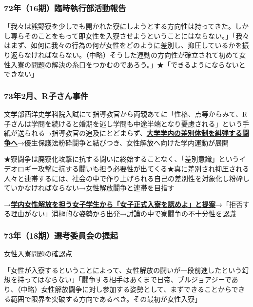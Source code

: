 \subsubsection{\large 72年（16期）臨時執行部活動報告}
「我々は熊野寮を少しでも開かれた寮にしようとする方向性は持ってきた。しかし専らそのことをもって即女性を入寮させようということにはならない。」\newline 「我々はまず、如何に我々の行為の何が女性をどのように差別し、抑圧しているかを振り返らなければならない。（中略）そうした運動の方向性が確立されて初めて女性入寮の問題の解決の糸口をつかむのであろう。」\newline ★「できるようにならないとできない」

\subsubsection{\large 73年2月、R子さん事件}
文学部西洋史学科院入試にて\newline 指導教官から両親あてに「性格、点等からみて、R子さんは学問を続けると婚期を逃し学問も中途半端となり憂慮される」という手紙が送られる\newline →指導教官の追及にとどまらず、\uline{\bf{大学学内の差別体制を糾弾する闘争へ}}\newline →優生保護法粉砕闘争と結びつき、女性解放へ向けた学内運動が展開

\vspace{1mm}
\noindent ★寮闘争は廃寮化攻撃に抗する闘いに終始することなく、「差別意識」というイデオロギー攻撃に抗する闘いも担う必要性が出てくる\newline ★真に差別され抑圧される人々と連帯するには、社会の中で作り上げられる自己の差別性を対象化し粉砕していかなければならない\newline →女性解放闘争と連帯を目指す

\vspace{1mm}
\noindent →\uline{\bf{学内女性解放を担う女子学生から「女子正式入寮を認めよ」と提案}}\newline →「拒否する理由がない」消極的な姿勢から出発\newline →討論の中で寮闘争の不十分性を認識

\subsubsection{\large 73年（18期）選考委員会の提起}
女性入寮問題の確認点

\vspace{1mm}
\noindent 「女性が入寮するということによって、女性解放の闘いが一段前進したという幻想を持ってはならない」\newline 「闘争する相手はあくまで日帝、ブルジョアジーであり、（中略）女性解放闘争に対し参加する姿勢として、まずできることからできる範囲で限界を突破する方向であるべき。その最初が女性入寮」

